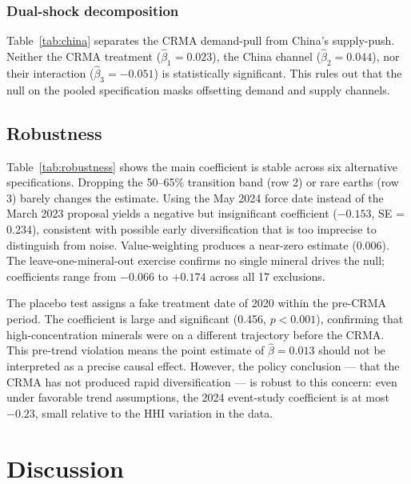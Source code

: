 \documentclass[12pt]{article}
\begin{document}


\subsubsection*{Dual-shock decomposition} Table~\ref{tab:china} separates the CRMA demand-pull from China's supply-push. Neither the CRMA treatment ($\hat{\beta}_1 = 0.023$), the China channel ($\hat{\beta}_2 = 0.044$), nor their interaction ($\hat{\beta}_3 = -0.051$) is statistically significant. This rules out that the null on the pooled specification masks offsetting demand and supply channels.



\subsection{Robustness}

Table~\ref{tab:robustness} shows the main coefficient is stable across six alternative specifications. Dropping the 50--65\% transition band (row 2) or rare earths (row 3) barely changes the estimate. Using the May 2024 force date instead of the March 2023 proposal yields a negative but insignificant coefficient ($-0.153$, SE = 0.234), consistent with possible early diversification that is too imprecise to distinguish from noise. Value-weighting produces a near-zero estimate (0.006). The leave-one-mineral-out exercise confirms no single mineral drives the null; coefficients range from $-0.066$ to $+0.174$ across all 17 exclusions.

The placebo test assigns a fake treatment date of 2020 within the pre-CRMA period. The coefficient is large and significant (0.456, $p < 0.001$), confirming that high-concentration minerals were on a different trajectory before the CRMA. This pre-trend violation means the point estimate of $\hat{\beta} = 0.013$ should not be interpreted as a precise causal effect. However, the policy conclusion --- that the CRMA has not produced rapid diversification --- is robust to this concern: even under favorable trend assumptions, the 2024 event-study coefficient is at most $-0.23$, small relative to the HHI variation in the data.




\section{Discussion}
\end{document}
